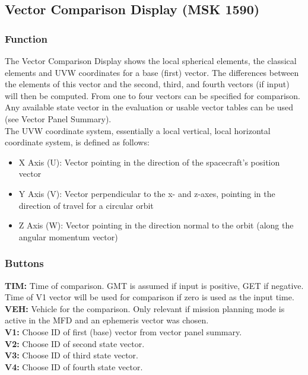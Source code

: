 \documentclass[11pt]{article} %
\begin{document}
\subsection{Vector Comparison Display (MSK 1590)}

\subsubsection{Function}

The Vector Comparison Display shows the local spherical elements, the classical elements and UVW coordinates for a base (first) vector. The differences between the elements of this vector and the second, third, and fourth vectors (if input) will then be computed. From one to four vectors can be specified for comparison. Any available state vector in the evaluation or usable vector tables can be used (see Vector Panel Summary).\\

The UVW coordinate system, essentially a local vertical, local horizontal coordinate system, is defined as follows:

\begin{itemize}
	\item X Axis (U): Vector pointing in the direction of the spacecraft's position vector\\
	\item Y Axis (V): Vector perpendicular to the x- and z-axes, pointing in the direction of travel for a circular orbit\\
	\item Z Axis (W): Vector pointing in the direction normal to the orbit (along the angular momentum vector)\\
\end{itemize}

\subsubsection{Buttons}

\textbf{TIM:} Time of comparison. GMT is assumed if input is positive, GET if negative. Time of V1 vector will be used for comparison if zero is used as the input time.\\
\textbf{VEH:} Vehicle for the comparison. Only relevant if mission planning mode is active in the MFD and an ephemeris vector was chosen.\\
\textbf{V1:} Choose ID of first (base) vector from vector panel summary.\\
\textbf{V2:} Choose ID of second state vector.\\
\textbf{V3:} Choose ID of third state vector.\\
\textbf{V4:} Choose ID of fourth state vector.\\
\end{document}
